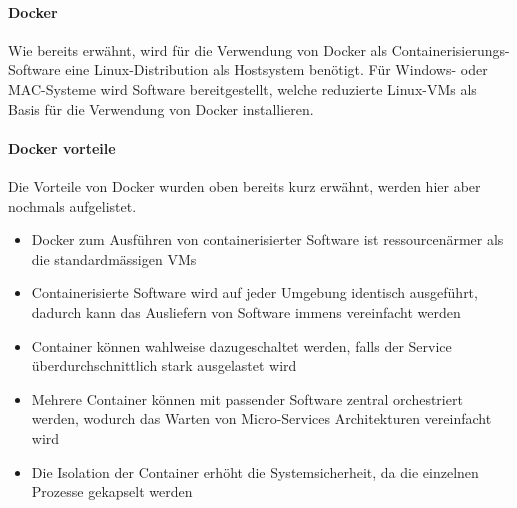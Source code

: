 \paragraph{Docker}
Wie bereits erwähnt, wird für die Verwendung von Docker als Containerisierungs-Software eine Linux-Distribution als Hostsystem benötigt.
Für Windows- oder MAC-Systeme wird Software bereitgestellt, welche reduzierte Linux-VMs als Basis für die Verwendung von Docker installieren.

\paragraph{Docker vorteile}
Die Vorteile von Docker wurden oben bereits kurz erwähnt, werden hier aber nochmals aufgelistet.
\begin{itemize}
	\item Docker zum Ausführen von containerisierter Software ist ressourcenärmer als die standardmässigen VMs
	\item Containerisierte Software wird auf jeder Umgebung identisch ausgeführt, dadurch kann das Ausliefern von Software immens vereinfacht werden
	\item Container können wahlweise dazugeschaltet werden, falls der Service überdurchschnittlich stark ausgelastet wird
	\item Mehrere Container können mit passender Software zentral orchestriert werden, wodurch das Warten von Micro-Services Architekturen vereinfacht wird
	\item Die Isolation der Container erhöht die Systemsicherheit, da die einzelnen Prozesse gekapselt werden
\end{itemize}
